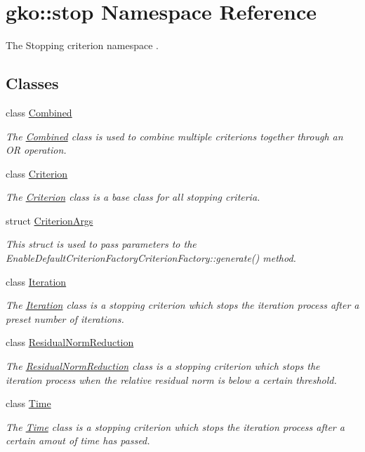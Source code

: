 \hypertarget{namespacegko_1_1stop}{}\section{gko\+:\+:stop Namespace Reference}
\label{namespacegko_1_1stop}


The Stopping criterion namespace .  


\subsection*{Classes}
\begin{DoxyCompactItemize}
\item 
class \hyperlink{classgko_1_1stop_1_1Combined}{Combined}
\begin{DoxyCompactList}\small\item\em The \hyperlink{classgko_1_1stop_1_1Combined}{Combined} class is used to combine multiple criterions together through an OR operation. \end{DoxyCompactList}\item 
class \hyperlink{classgko_1_1stop_1_1Criterion}{Criterion}
\begin{DoxyCompactList}\small\item\em The \hyperlink{classgko_1_1stop_1_1Criterion}{Criterion} class is a base class for all stopping criteria. \end{DoxyCompactList}\item 
struct \hyperlink{structgko_1_1stop_1_1CriterionArgs}{Criterion\+Args}
\begin{DoxyCompactList}\small\item\em This struct is used to pass parameters to the Enable\+Default\+Criterion\+Factory\+Criterion\+Factory\+::generate() method. \end{DoxyCompactList}\item 
class \hyperlink{classgko_1_1stop_1_1Iteration}{Iteration}
\begin{DoxyCompactList}\small\item\em The \hyperlink{classgko_1_1stop_1_1Iteration}{Iteration} class is a stopping criterion which stops the iteration process after a preset number of iterations. \end{DoxyCompactList}\item 
class \hyperlink{classgko_1_1stop_1_1ResidualNormReduction}{Residual\+Norm\+Reduction}
\begin{DoxyCompactList}\small\item\em The \hyperlink{classgko_1_1stop_1_1ResidualNormReduction}{Residual\+Norm\+Reduction} class is a stopping criterion which stops the iteration process when the relative residual norm is below a certain threshold. \end{DoxyCompactList}\item 
class \hyperlink{classgko_1_1stop_1_1Time}{Time}
\begin{DoxyCompactList}\small\item\em The \hyperlink{classgko_1_1stop_1_1Time}{Time} class is a stopping criterion which stops the iteration process after a certain amout of time has passed. \end{DoxyCompactList}\end{DoxyCompactItemize}
